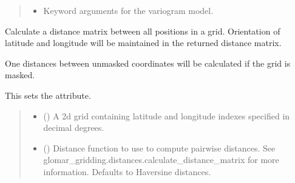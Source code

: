 \documentclass[letterpaper,10pt,english]{sphinxmanual}
\begin{document}
\begin{fulllineitems}
\begin{fulllineitems}
\begin{quote}
\begin{description}
\begin{itemize}
\item {}
\sphinxAtStartPar
{} \textendash{} Keyword arguments for the variogram model.

\end{itemize}

\sphinxAtStartPar
{}

\end{description}\end{quote}

\end{fulllineitems}


\begin{fulllineitems}
\label{\detokenize{grid:glomar_gridding.grid.Grid.distance_matrix}}
\pysigstartsignatures
\pysiglinewithargsret
{}
{\sphinxparamcomma {}}
{}
\pysigstopsignatures
\sphinxAtStartPar
Calculate a distance matrix between all positions in a grid. Orientation
of latitude and longitude will be maintained in the returned distance
matrix.

\sphinxAtStartPar
One distances between unmasked coordinates will be calculated if the
grid is masked.

\sphinxAtStartPar
This sets the  attribute.
\begin{quote}\begin{description}
\begin{itemize}
\item {}
\sphinxAtStartPar
{} () \textendash{} A 2\sphinxhyphen{}d grid containing latitude and longitude indexes specified in
decimal degrees.

\item {}
\sphinxAtStartPar
{} () \textendash{} Distance function to use to compute pairwise distances. See
glomar\_gridding.distances.calculate\_distance\_matrix for more
information. Defaults to Haversine distances.


\end{itemize}
\end{description}
\end{quote}
\end{fulllineitems}
\end{fulllineitems}
\end{document}
